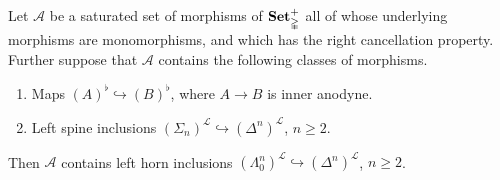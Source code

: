 \documentclass[main.tex]{subfiles}
\begin{document}
\begin{lemma}
  \label{lemma:saturated_hull_of_left_spine_inclusions}
  Let $\mathcal{A}$ be a saturated set of morphisms of $\mathbf{Set}_{\mathbb{\Delta}}^{+}$ all of whose underlying morphisms are monomorphisms, and which has the right cancellation property. Further suppose that $\mathcal{A}$ contains the following classes of morphisms.
  \begin{enumerate}
    \item Maps $(A)^{\flat} \hookrightarrow (B)^{\flat}$, where $A \to B$ is inner anodyne.

    \item Left spine inclusions $(\Sigma_{n})^{\mathcal{L}} \hookrightarrow (\Delta^{n})^{\mathcal{L}}$, $n \geq 2$.
  \end{enumerate}

  Then $\mathcal{A}$ contains left horn inclusions $(\Lambda^{n}_{0})^{\mathcal{L}} \hookrightarrow (\Delta^{n})^{\mathcal{L}}$, $n \geq 2$.
\end{lemma}
\end{document}
